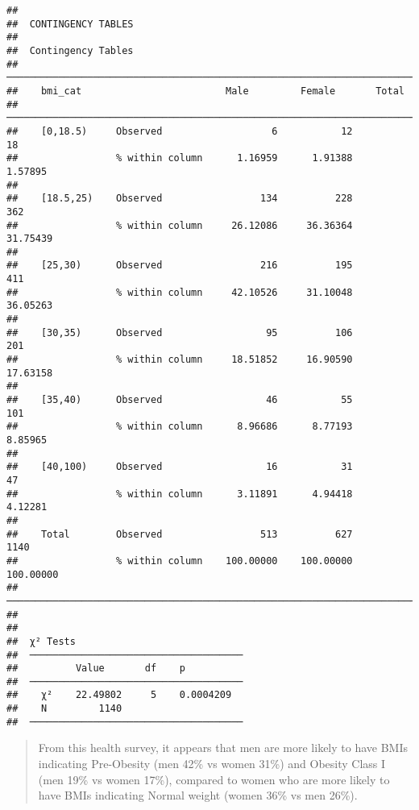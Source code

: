 \documentclass[
]{memoir}
\begin{document}
\begin{verbatim}
## 
##  CONTINGENCY TABLES
## 
##  Contingency Tables                                                      
##  ─────────────────────────────────────────────────────────────────────── 
##    bmi_cat                         Male         Female       Total       
##  ─────────────────────────────────────────────────────────────────────── 
##    [0,18.5)     Observed                   6           12           18   
##                 % within column      1.16959      1.91388      1.57895   
##                                                                          
##    [18.5,25)    Observed                 134          228          362   
##                 % within column     26.12086     36.36364     31.75439   
##                                                                          
##    [25,30)      Observed                 216          195          411   
##                 % within column     42.10526     31.10048     36.05263   
##                                                                          
##    [30,35)      Observed                  95          106          201   
##                 % within column     18.51852     16.90590     17.63158   
##                                                                          
##    [35,40)      Observed                  46           55          101   
##                 % within column      8.96686      8.77193      8.85965   
##                                                                          
##    [40,100)     Observed                  16           31           47   
##                 % within column      3.11891      4.94418      4.12281   
##                                                                          
##    Total        Observed                 513          627         1140   
##                 % within column    100.00000    100.00000    100.00000   
##  ─────────────────────────────────────────────────────────────────────── 
## 
## 
##  χ² Tests                              
##  ───────────────────────────────────── 
##          Value       df    p           
##  ───────────────────────────────────── 
##    χ²    22.49802     5    0.0004209   
##    N         1140                      
##  ─────────────────────────────────────
\end{verbatim}

\begin{quote}
From this health survey, it appears that men are more likely to have BMIs indicating Pre-Obesity (men 42\% vs women 31\%) and Obesity Class I (men 19\% vs women 17\%), compared to women who are more likely to have BMIs indicating Normal weight (women 36\% vs men 26\%).
\end{quote}
\end{document}
